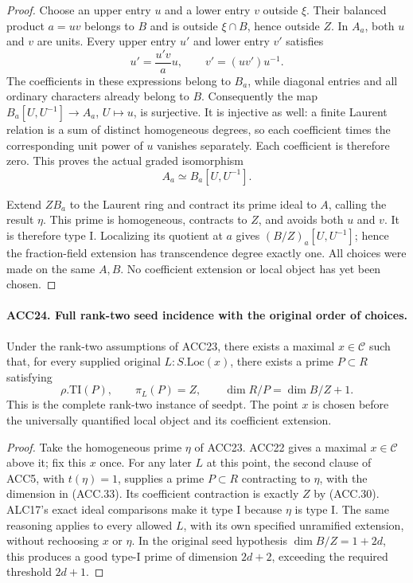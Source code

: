 \documentclass[11pt,a4paper]{article}
\numberwithin{equation}{section}
\theoremstyle{remark}\newtheorem{remark}[theorem]{Remark}
\begin{document}
\begin{proof}
Choose an upper entry \(u\) and a lower entry \(v\) outside
\(\xi\).  Their balanced product \(a=uv\) belongs to \(B\)
and is outside \(\xi\cap B\), hence outside \(Z\).
In \(A_a\), both \(u\) and \(v\) are units.  Every upper
entry \(u'\) and lower entry \(v'\) satisfies
\[
                   u'=\frac{u'v}{a}u,\qquad
                   v'=(uv')u^{-1}.                        \tag{ACC.31}
\]
The coefficients in these expressions belong to \(B_a\), while
diagonal entries and all ordinary characters already belong to
\(B\).  Consequently the map
\(B_a[U,U^{-1}]\to A_a\), \(U\mapsto u\), is surjective.
It is injective as well: a finite Laurent relation is a sum of
distinct homogeneous degrees, so each coefficient times the
corresponding unit power of \(u\) vanishes separately.  Each
coefficient is therefore zero.  This proves the actual graded
isomorphism
\[
                         A_a\simeq B_a[U,U^{-1}].         \tag{ACC.32}
\]

Extend \(ZB_a\) to the Laurent ring and contract its prime
ideal to \(A\), calling the result \(\eta\).  This prime
is homogeneous, contracts to \(Z\), and avoids both \(u\)
and \(v\).  It is therefore type I.  Localizing its quotient
at \(a\) gives \((B/Z)_a[U,U^{-1}]\); hence the fraction-field
extension has transcendence degree exactly one.  All choices were
made on the same \(A,B\).  No coefficient extension or local
object has yet been chosen.
\end{proof}

\paragraph{ACC24. Full rank-two seed incidence with the original order of choices.}
\label{claim:ACC24}
Under the rank-two assumptions of ACC23, there exists a maximal
\(x\in\mathcal C\) such that, for every supplied original
\(L:S.\mathrm{Loc}(x)\), there exists a prime \(P\subset R\)
satisfying
\[
 \rho.\mathrm{TI}(P),\qquad \pi_L(P)=Z,\qquad
                      \dim R/P=\dim B/Z+1.               \tag{ACC.33}
\]
This is the complete rank-two instance of \(\mathrm{seedpt}\).
The point \(x\) is chosen before the universally quantified
local object and its coefficient extension.

\begin{proof}
Take the homogeneous prime \(\eta\) of ACC23.  ACC22 gives a
maximal \(x\in\mathcal C\) above it; fix this \(x\) once.
For any later \(L\) at this point, the second clause of ACC5,
with \(t(\eta)=1\), supplies a prime \(P\subset R\)
contracting to \(\eta\), with the dimension in (ACC.33).
Its coefficient contraction is exactly \(Z\) by (ACC.30).
ALC17's exact ideal comparisons make it type I because \(\eta\)
is type I.  The same reasoning applies to every allowed \(L\),
with its own specified unramified extension, without rechoosing
\(x\) or \(\eta\).  In the original seed hypothesis
\(\dim B/Z=1+2d\), this produces a good type-I prime of
dimension \(2d+2\), exceeding the required threshold \(2d+1\).
\end{proof}
\end{document}

